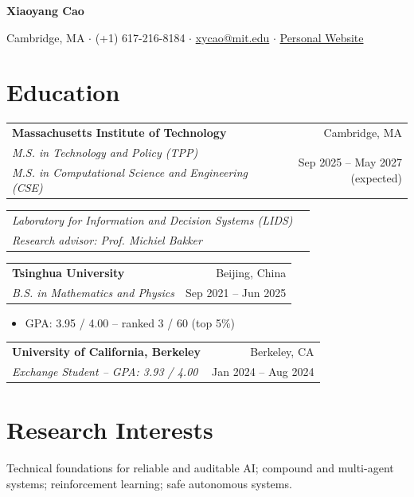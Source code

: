 \documentclass[10pt,letterpaper]{article}
\makeatletter
\newcommand{\cvrow}[4]{%
\begin{tabularx}{\textwidth}{@{}Xr@{}}
\textbf{#1} & #2\\[-0.03em]
\textit{#3} & #4
\end{tabularx}\vspace{-0.05em}
}
\makeatother
\begin{document}
\fontsize{10.35}{12.25}\selectfont

\begin{center}
{\fontsize{21.5}{24}\selectfont\bfseries Xiaoyang Cao}\par
\vspace{0.55em}
{\fontsize{9.6}{11.3}\selectfont
Cambridge, MA \; $\cdot$ \; (+1) 617-216-8184 \; $\cdot$ \;
\href{mailto:xycao@mit.edu}{xycao@mit.edu} \; $\cdot$ \;
\href{https://xiaoyangcao1113.github.io/}{Personal Website}}
\end{center}
\vspace{0.85em}

\section{Education}

\begin{tabularx}{\textwidth}{@{}Xr@{}}
\textbf{Massachusetts Institute of Technology} & Cambridge, MA\\[-0.03em]
\textit{M.S. in Technology and Policy (TPP)} & \multirow{2}{*}{Sep 2025 -- May 2027 (expected)}\\[-0.03em]
\textit{M.S. in Computational Science and Engineering (CSE)} &
\end{tabularx}\vspace{-0.05em}
\begin{tabularx}{\textwidth}{@{}Xr@{}}
\textit{Laboratory for Information and Decision Systems (LIDS)} &\\[-0.03em]
\textit{Research advisor: Prof. Michiel Bakker} &
\end{tabularx}

\vspace{0.46em}
\cvrow{Tsinghua University}{Beijing, China}
{B.S. in Mathematics and Physics}{Sep 2021 -- Jun 2025}
\begin{itemize}[leftmargin=1.45em,labelsep=0.55em,itemsep=0em,topsep=0.18em,parsep=0em]
\item GPA: 3.95 / 4.00 -- ranked 3 / 60 (top 5\%)
\end{itemize}

\vspace{0.52em}
\cvrow{University of California, Berkeley}{Berkeley, CA}
{Exchange Student -- GPA: 3.93 / 4.00}{Jan 2024 -- Aug 2024}

\vspace{0.30em}
\section{Research Interests}
Technical foundations for reliable and auditable AI; compound and multi-agent systems; reinforcement learning; safe autonomous systems.
\end{document}
